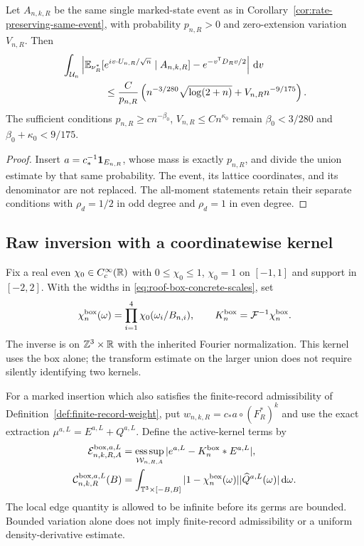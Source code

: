 \begin{corollary}
\label{cor:anisotropic-same-event}
Let $A_{n,k,R}$ be the same single marked-state event as in
Corollary~\ref{cor:rate-preserving-same-event}, with probability
$p_{n,R}>0$ and zero-extension variation $V_{n,R}$. Then
\begin{align}
 &\int_{\mathcal U_n}
 \left|\mathbb E_{\nu_R^*}
  [e^{iv\cdot U_{n,R}/\sqrt n}\mid A_{n,k,R}]
                        -e^{-v^{\mathsf T}D_Rv/2}\right|\dd v\notag\\
 &\hspace{15mm}\le\frac C{p_{n,R}}
       \left(n^{-3/280}\sqrt{\log(2+n)}+V_{n,R}n^{-9/175}\right).
 \label{eq:anisotropic-same-event}
\end{align}
The sufficient conditions $p_{n,R}\ge cn^{-\beta_0}$,
$V_{n,R}\le Cn^{\kappa_0}$ remain
$\beta_0<3/280$ and $\beta_0+\kappa_0<9/175$.
\end{corollary}
\begin{proof}
Insert $a=c_*^{-1}\mathbf1_{E_{n,R}}$, whose mass is exactly $p_{n,R}$,
and divide the union estimate by that same probability. The event,
its lattice coordinates, and its denominator are not replaced. The
all-moment statements retain their separate conditions with
$\rho_d=1/2$ in odd degree and $\rho_d=1$ in even degree.
\end{proof}

\subsection{Raw inversion with a coordinatewise kernel}
Fix a real even $\chi_0\in C_c^\infty(\mathbb R)$ with $0\le\chi_0\le1$,
$\chi_0=1$ on $[-1,1]$ and support in $[-2,2]$. With the widths in
\eqref{eq:roof-box-concrete-scales}, set
\begin{equation}\label{eq:roof-box-kernel}
 \chi_n^{\rm box}(\omega)=\prod_{i=1}^4\chi_0(\omega_i/B_{n,i}),
 \qquad K_n^{\rm box}=\mathcal F^{-1}\chi_n^{\rm box}.
\end{equation}
The inverse is on $\mathbb Z^3\times\mathbb R$ with the inherited Fourier
normalization. This kernel uses the box alone; the transform estimate
on the larger union does not require silently identifying two kernels.

For a marked insertion which also satisfies the finite-record
admissibility of Definition~\ref{def:finite-record-weight}, put
$w_{n,k,R}=c_*a\circ(F_R^*)^k$ and use the exact extraction
$\mu^{a,L}=E^{a,L}+Q^{a,L}$. Define the active-kernel terms by
\begin{align}
 \mathcal E^{{\rm box},a,L}_{n,k,R,A}
 &=\mathop{\rm ess\,sup}_{\mathcal W_{n,R,A}}
                     |e^{a,L}-K_n^{\rm box}*E^{a,L}|,\notag\\
 \mathcal C^{{\rm box},a,L}_{n,k,R}(B)
 &=\int_{\T^3\times[-B,B]}|1-\chi_n^{\rm box}(\omega)|
                              |\widehat Q^{a,L}(\omega)|\dd\omega.
 \label{eq:roof-box-raw-terms}
\end{align}
The local edge quantity is allowed to be infinite before its germs
are bounded. Bounded variation alone does not imply finite-record
admissibility or a uniform density-derivative estimate.

